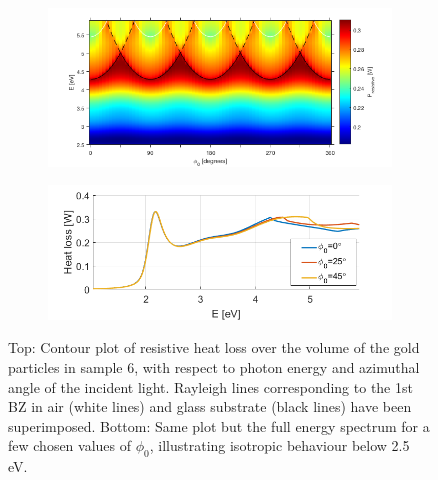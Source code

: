\begin{figure}[h!]  %
    \begin{subfigure}{\textwidth}
        \centering
        \includegraphics[width=0.8\linewidth, trim=0cm 0cm 1cm 0.5cm, clip]{figures/ch4/S6/contour/S6_HeatLoss_contour(1).png}
    \end{subfigure}
    
    \begin{subfigure}{\textwidth}
        \centering
        \includegraphics[width=0.6\linewidth, trim=0cm 0cm 0cm 0cm, clip]{figures/ch4/S6/contour/S6_HeatLoss_phi=0,25,45.png}
    \end{subfigure}
    
    \caption{Top: Contour plot of resistive heat loss over the volume of the gold particles in sample 6, with respect to photon energy and azimuthal angle of the incident light. Rayleigh lines corresponding to the 1st BZ in air (white lines) and glass substrate (black lines) have been superimposed. Bottom: Same plot but the full energy spectrum for a few chosen values of $\phi_0$, illustrating isotropic behaviour below 2.5 eV.}
    \label{fig:S6_heatloss}
\end{figure}

